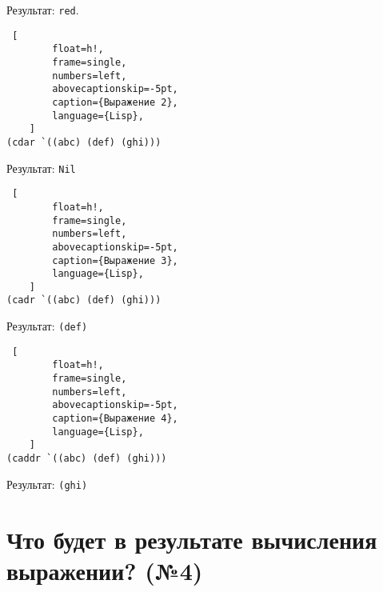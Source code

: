 Результат: \texttt{red}.

\begin{lstlisting} [
		float=h!,
		frame=single,
		numbers=left,
		abovecaptionskip=-5pt,
		caption={Выражение 2},
		language={Lisp},
	]
(cdar `((abc) (def) (ghi)))
\end{lstlisting}

Результат: \texttt{Nil}
\clearpage
\begin{lstlisting} [
		float=h!,
		frame=single,
		numbers=left,
		abovecaptionskip=-5pt,
		caption={Выражение 3},
		language={Lisp},
	]
(cadr `((abc) (def) (ghi)))
\end{lstlisting}

Результат: \texttt{(def)}

\begin{lstlisting} [
		float=h!,
		frame=single,
		numbers=left,
		abovecaptionskip=-5pt,
		caption={Выражение 4},
		language={Lisp},
	]
(caddr `((abc) (def) (ghi)))
\end{lstlisting}

Результат: \texttt{(ghi)}

\section{Что будет в результате вычисления выражении? (№4)}

